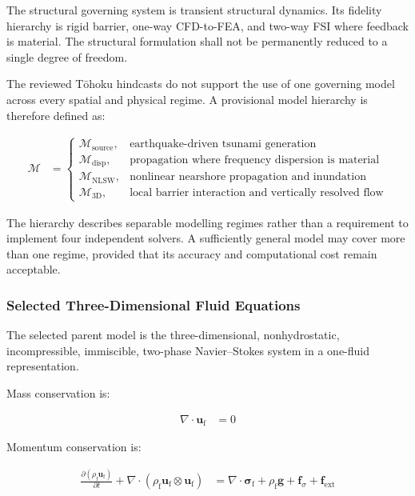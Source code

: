 The structural governing system is transient structural dynamics. Its
fidelity hierarchy is rigid barrier, one-way CFD-to-FEA, and two-way
FSI where feedback is material. The structural formulation shall not be
permanently reduced to a single degree of freedom.

The reviewed Tōhoku hindcasts do not support the use of one governing
model across every spatial and physical regime. A provisional
model hierarchy is therefore defined as:

\begin{align}
  \mathcal{M}
  &=
  \begin{cases}
    \mathcal{M}_{\mathrm{source}},
    &
    \text{earthquake-driven tsunami generation}
    \\
    \mathcal{M}_{\mathrm{disp}},
    &
    \text{propagation where frequency dispersion is material}
    \\
    \mathcal{M}_{\mathrm{NLSW}},
    &
    \text{nonlinear nearshore propagation and inundation}
    \\
    \mathcal{M}_{\mathrm{3D}},
    &
    \text{local barrier interaction and vertically resolved flow}
  \end{cases}
  \label{eq:res-mod-eqs-provisional-model-hierarchy}
\end{align}

The hierarchy describes separable modelling regimes rather than a
requirement to implement four independent solvers. A sufficiently
general model may cover more than one regime, provided that its
accuracy and computational cost remain acceptable.

\subsubsection{Selected Three-Dimensional Fluid Equations}
\label{sec:res-mod-eqs-local-selected-equations}

The selected parent model is the three-dimensional, nonhydrostatic,
incompressible, immiscible, two-phase Navier--Stokes system in a
one-fluid representation.

Mass conservation is:

\begin{align}
  \nabla\cdot\mathbf{u}_{\mathrm{f}}
  &=
  0
  \label{eq:res-mod-eqs-local-continuity}
\end{align}

Momentum conservation is:

\begin{align}
  \frac{\partial
    \left(
      \rho_{\mathrm{f}}\mathbf{u}_{\mathrm{f}}
  \right)}
  {\partial t}
  +
  \nabla\cdot
  \left(
    \rho_{\mathrm{f}}
    \mathbf{u}_{\mathrm{f}}
    \otimes
    \mathbf{u}_{\mathrm{f}}
  \right)
  &=
  \nabla\cdot\boldsymbol{\sigma}_{\mathrm{f}}
  +
  \rho_{\mathrm{f}}\mathbf{g}
  +
  \mathbf{f}_{\sigma}
  +
  \mathbf{f}_{\mathrm{ext}}
  \label{eq:res-mod-eqs-local-momentum}
\end{align}

